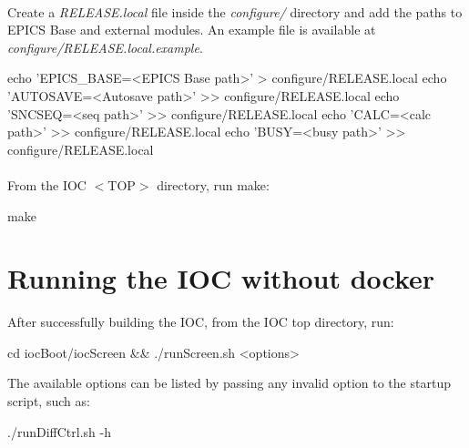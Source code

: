 \documentclass[openany]{article}
\begin{document}
        \paragraph{} Create a \emph{RELEASE.local} file inside the \emph{configure/} directory and add the paths to EPICS Base and external modules. An example file is available at \emph{configure/RELEASE.local.example}.

            \vspace{1mm}
            \begin{code}
echo 'EPICS_BASE=<EPICS Base path>' > configure/RELEASE.local
echo 'AUTOSAVE=<Autosave path>' >> configure/RELEASE.local
echo 'SNCSEQ=<seq path>' >> configure/RELEASE.local
echo 'CALC=<calc path>' >> configure/RELEASE.local
echo 'BUSY=<busy path>' >> configure/RELEASE.local
            \end{code}
            \vspace{1mm}

        \paragraph{} From the IOC $<$TOP$>$ directory, run make:

            \vspace{1mm}
            \begin{code}
make
            \end{code}
            \vspace{1mm}

\section{Running the IOC without docker}

    After successfully building the IOC, from the IOC top directory, run:

        \vspace{1mm}
        \begin{code}
cd iocBoot/iocScreen &&
./runScreen.sh <options>
        \end{code}
        \vspace{1mm}

    The available options can be listed by passing any invalid option to the startup script, such as:

        \vspace{1mm}
        \begin{code}
./runDiffCtrl.sh -h
        \end{code}
        \vspace{1mm}
\end{document}
